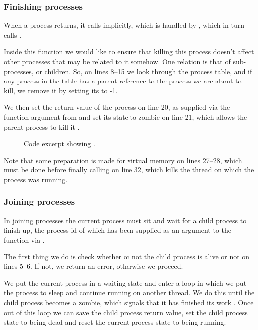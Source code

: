 {\subsubsection{Finishing processes}
When a process returns, it calls  implicitly, which is
handled by  ,
which in turn calls .

Inside this function we would like to ensure that killing this process doesn't
affect other processes that may be related to it somehow. One relation is that
of sub-processes, or children. So, on lines 8--15 we look through the process
table, and if any process in the table has a parent reference to the process
we are about to kill, we remove it by setting its  to -1.

We then set the return value of the process on line 20, as supplied via the
function argument from  and set its state to
zombie on line 21, which allows the parent process to kill it
.

\begin{figure}[H]
    
    \caption{Code excerpt showing .}
    \label{code:process_finish}
\end{figure}

Note that some preparation is made for virtual memory on lines 27--28, which
must be done before finally calling  on line 32, which
kills the thread on which the process was running.

\subsubsection{Joining processes}
In joining processes the current process must sit and wait for a child process
to finish up, the process id of which has been supplied as an argument to the
function via  .

The first thing we do is check whether or not the child process is alive or
not on lines 5--6. If not, we return an error, otherwise we proceed.

We put the current process in a waiting state and enter a loop in which we
put the process to sleep and continue running on another thread. We do this
until the child process becomes a zombie, which signals that it has finished
its work . Once out of this loop we can save the
child process return value, set the child process state to being dead and
reset the current process state to being running.

}
